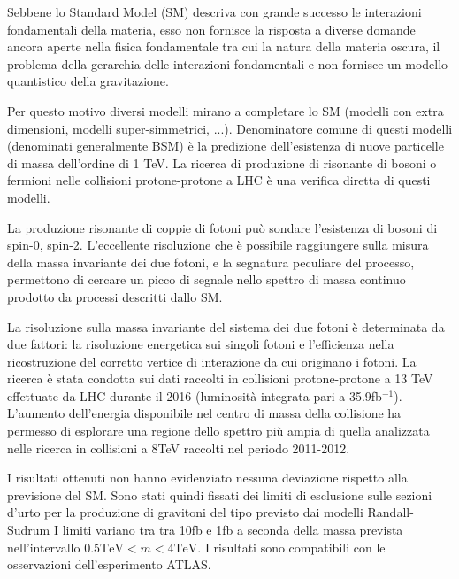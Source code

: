 Sebbene lo Standard Model (SM) descriva con grande successo le interazioni fondamentali della materia, esso
non fornisce la risposta a diverse domande ancora aperte nella fisica
fondamentale tra cui la natura della materia oscura, il problema della gerarchia delle
interazioni fondamentali e non fornisce un modello quantistico della gravitazione.

Per questo motivo diversi modelli mirano a completare lo SM (modelli con extra dimensioni,
modelli super-simmetrici, ...). Denominatore comune di questi modelli (denominati
generalmente BSM) è la predizione dell'esistenza di nuove particelle di massa dell'ordine
di 1 TeV. La ricerca di produzione di risonante di bosoni o fermioni nelle collisioni
protone-protone a LHC è una verifica diretta di questi modelli.

La produzione risonante di coppie di fotoni può sondare l'esistenza di
bosoni di spin-0, spin-2. L'eccellente risoluzione
che è possibile raggiungere sulla misura della massa invariante dei due fotoni, e la segnatura
peculiare del processo, permettono di cercare un picco di segnale nello spettro
di massa continuo prodotto da processi descritti dallo SM. 

La risoluzione sulla massa invariante del sistema dei due fotoni è determinata da due
fattori: la risoluzione energetica sui singoli fotoni e l'efficienza nella ricostruzione
del corretto vertice di interazione da cui originano i fotoni. 
La ricerca è stata condotta sui dati raccolti in collisioni protone-protone a 13 TeV effettuate
da LHC durante il 2016 (luminosità integrata pari a 35.9fb$^{-1}$).
L'aumento dell'energia disponibile nel centro di massa della collisione ha permesso
di esplorare una regione dello spettro più ampia di quella analizzata nelle
ricerca in collisioni a 8TeV raccolti nel periodo 2011-2012.

I risultati ottenuti non hanno evidenziato nessuna deviazione rispetto alla previsione del SM.
Sono stati quindi fissati dei limiti di esclusione sulle sezioni d'urto per
la produzione di gravitoni del tipo previsto dai modelli Randall-Sudrum
I limiti variano tra tra 10fb e 1fb a
seconda della massa prevista nell'intervallo $0.5 \mbox{TeV} < m < 4 \mbox{TeV}$.
I risultati sono compatibili con le osservazioni dell'esperimento ATLAS.

